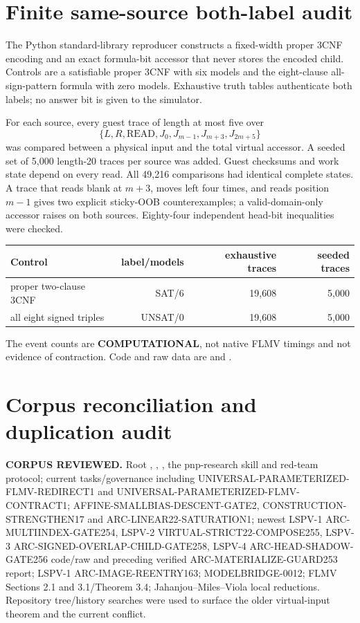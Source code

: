 \documentclass[11pt]{article}
\begin{document}
\section{Finite same-source both-label audit}
The Python standard-library reproducer constructs a fixed-width proper 3CNF encoding and an exact formula-bit accessor that never stores the encoded child. Controls are a satisfiable proper 3CNF with six models and the eight-clause all-sign-pattern formula with zero models. Exhaustive truth tables authenticate both labels; no answer bit is given to the simulator.

For each source, every guest trace of length at most five over
\[
 \{L,R,\mathrm{READ},J_0,J_{m-1},J_{m+3},J_{2m+5}\}
\]
was compared between a physical input and the total virtual accessor. A seeded set of 5,000 length-20 traces per source was added. Guest checksums and work state depend on every read. All 49,216 comparisons had identical complete states. A trace that reads blank at $m+3$, moves left four times, and reads position $m-1$ gives two explicit sticky-OOB counterexamples; a valid-domain-only accessor raises on both sources. Eighty-four independent head-bit inequalities were checked.

\begin{center}
\begin{tabular}{@{}lrrr@{}}
\toprule
Control & label/models & exhaustive traces & seeded traces\\
\midrule
proper two-clause 3CNF & SAT/6 & 19,608 & 5,000\\
all eight signed triples & UNSAT/0 & 19,608 & 5,000\\
\bottomrule
\end{tabular}
\end{center}
The event counts are \textbf{COMPUTATIONAL}, not native FLMV timings and not evidence of contraction. Code and raw data are
 and
.

\section{Corpus reconciliation and duplication audit}
\textbf{CORPUS REVIEWED.} Root , , , the pnp-research skill and red-team protocol; current tasks/governance including UNIVERSAL-PARAMETERIZED-FLMV-REDIRECT1 and UNIVERSAL-PARAMETERIZED-FLMV-CONTRACT1; AFFINE-SMALLBIAS-DESCENT-GATE2, CONSTRUCTION-STRENGTHEN17 and ARC-LINEAR22-SATURATION1; newest LSPV-1 ARC-MULTIINDEX-GATE254, LSPV-2 VIRTUAL-STRICT22-COMPOSE255, LSPV-3 ARC-SIGNED-OVERLAP-CHILD-GATE258, LSPV-4 ARC-HEAD-SHADOW-GATE256 code/raw and preceding verified ARC-MATERIALIZE-GUARD253 report; LSPV-1 ARC-IMAGE-REENTRY163; MODELBRIDGE-0012; FLMV Sections 2.1 and 3.1/Theorem 3.4; Jahanjou--Miles--Viola local reductions. Repository tree/history searches were used to surface the older virtual-input theorem and the current conflict.
\end{document}
